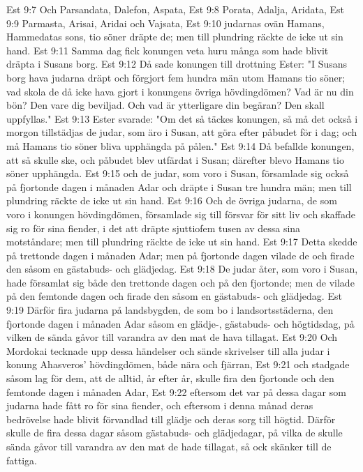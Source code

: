 Est 9:7  Och Parsandata, Dalefon, Aspata,
Est 9:8  Porata, Adalja, Aridata,
Est 9:9  Parmasta, Arisai, Aridai och Vajsata,
Est 9:10  judarnas ovän Hamans, Hammedatas sons, tio söner dräpte de; men till plundring räckte de icke ut sin hand.
Est 9:11  Samma dag fick konungen veta huru många som hade blivit dräpta i Susans borg.
Est 9:12  Då sade konungen till drottning Ester: "I Susans borg hava judarna dräpt och förgjort fem hundra män utom Hamans tio söner; vad skola de då icke hava gjort i konungens övriga hövdingdömen? Vad är nu din bön? Den vare dig beviljad. Och vad är ytterligare din begäran? Den skall uppfyllas."
Est 9:13  Ester svarade: "Om det så täckes konungen, så må det också i morgon tillstädjas de judar, som äro i Susan, att göra efter påbudet för i dag; och må Hamans tio söner bliva upphängda på pålen."
Est 9:14  Då befallde konungen, att så skulle ske, och påbudet blev utfärdat i Susan; därefter blevo Hamans tio söner upphängda.
Est 9:15  och de judar, som voro i Susan, församlade sig också på fjortonde dagen i månaden Adar och dräpte i Susan tre hundra män; men till plundring räckte de icke ut sin hand.
Est 9:16  Och de övriga judarna, de som voro i konungen hövdingdömen, församlade sig till försvar för sitt liv och skaffade sig ro för sina fiender, i det att dräpte sjuttiofem tusen av dessa sina motståndare; men till plundring räckte de icke ut sin hand.
Est 9:17  Detta skedde på trettonde dagen i månaden Adar; men på fjortonde dagen vilade de och firade den såsom en gästabuds- och glädjedag.
Est 9:18  De judar åter, som voro i Susan, hade församlat sig både den trettonde dagen och på den fjortonde; men de vilade på den femtonde dagen och firade den såsom en gästabuds- och glädjedag.
Est 9:19  Därför fira judarna på landsbygden, de som bo i landsortsstäderna, den fjortonde dagen i månaden Adar såsom en glädje-, gästabuds- och högtidsdag, på vilken de sända gåvor till varandra av den mat de hava tillagat.
Est 9:20  Och Mordokai tecknade upp dessa händelser och sände skrivelser till alla judar i konung Ahasveros' hövdingdömen, både nära och fjärran,
Est 9:21  och stadgade såsom lag för dem, att de alltid, år efter år, skulle fira den fjortonde och den femtonde dagen i månaden Adar,
Est 9:22  eftersom det var på dessa dagar som judarna hade fått ro för sina fiender, och eftersom i denna månad deras bedrövelse hade blivit förvandlad till glädje och deras sorg till högtid. Därför skulle de fira dessa dagar såsom gästabuds- och glädjedagar, på vilka de skulle sända gåvor till varandra av den mat de hade tillagat, så ock skänker till de fattiga.
